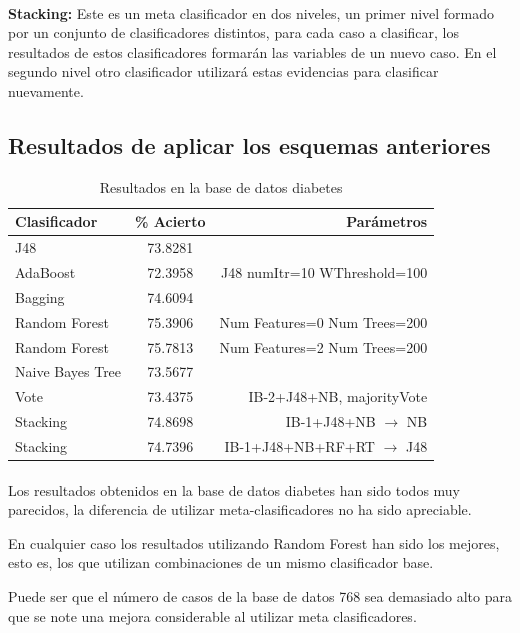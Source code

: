 \documentclass[es]{ifirak}
\begin{document}
\paragraph{}
\textbf{Stacking:} Este es un meta clasificador en dos niveles,  un primer nivel formado por un conjunto de clasificadores distintos, para cada caso a clasificar, los resultados de estos clasificadores formarán las variables de un nuevo caso. En el segundo nivel otro clasificador utilizará estas evidencias para clasificar nuevamente.

\subsection{Resultados de aplicar los esquemas anteriores}

\begin{table}[htbp]
	\centering
	\begin{tabular}{l|c|r|}
		Clasificador & \% Acierto & Parámetros \\
		\hline
		J48 & 73.8281 & \\
		AdaBoost &  72.3958  & J48 numItr=10 WThreshold=100 \\
		Bagging & 74.6094 &\\
		Random Forest  & 75.3906 & Num Features=0 Num Trees=200 \\
		Random Forest  & 75.7813 & Num Features=2 Num Trees=200 \\
		Naive Bayes Tree  & 73.5677 &\\
		Vote  & 73.4375 & IB-2+J48+NB, majorityVote \\
		Stacking  & 74.8698 & IB-1+J48+NB $\rightarrow$ NB \\
		Stacking  & 74.7396 & IB-1+J48+NB+RF+RT $\rightarrow$ J48  \\
	\end{tabular}
	\caption{Resultados en la base de datos diabetes}\label{table}
\end{table}

\paragraph{}
Los resultados obtenidos en la base de datos diabetes han sido todos muy parecidos, la diferencia de utilizar meta-clasificadores no ha sido apreciable.

 En cualquier caso los resultados utilizando Random Forest han sido los mejores, esto es, los que utilizan combinaciones de un mismo clasificador base.

Puede ser que el número de casos de la base de datos 768 sea demasiado alto para que se note una mejora considerable al utilizar meta clasificadores.
\end{document}
